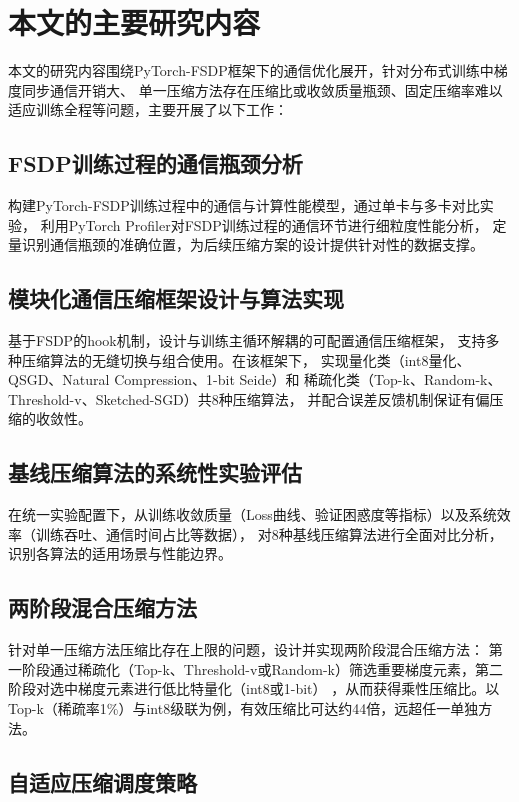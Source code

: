 \section{本文的主要研究内容}

本文的研究内容围绕PyTorch-FSDP框架下的通信优化展开，针对分布式训练中梯度同步通信开销大、
单一压缩方法存在压缩比或收敛质量瓶颈、固定压缩率难以适应训练全程等问题，主要开展了以下工作：

\subsection{FSDP训练过程的通信瓶颈分析}

构建PyTorch-FSDP训练过程中的通信与计算性能模型，通过单卡与多卡对比实验，
利用PyTorch Profiler对FSDP训练过程的通信环节进行细粒度性能分析，
定量识别通信瓶颈的准确位置，为后续压缩方案的设计提供针对性的数据支撑。

\subsection{模块化通信压缩框架设计与算法实现}

基于FSDP的hook机制，设计与训练主循环解耦的可配置通信压缩框架，
支持多种压缩算法的无缝切换与组合使用。在该框架下，
实现量化类（int8量化、QSGD、Natural Compression、1-bit Seide）和
稀疏化类（Top-k、Random-k、Threshold-v、Sketched-SGD）共8种压缩算法，
并配合误差反馈机制保证有偏压缩的收敛性。

\subsection{基线压缩算法的系统性实验评估}

在统一实验配置下，从训练收敛质量（Loss曲线、验证困惑度等指标）以及系统效率（训练吞吐、通信时间占比等数据），
对8种基线压缩算法进行全面对比分析，识别各算法的适用场景与性能边界。

\subsection{两阶段混合压缩方法}

针对单一压缩方法压缩比存在上限的问题，设计并实现两阶段混合压缩方法：
第一阶段通过稀疏化（Top-k、Threshold-v或Random-k）筛选重要梯度元素，第二阶段对选中梯度元素进行低比特量化（int8或1-bit）
，从而获得乘性压缩比。以Top-k（稀疏率1\%）与int8级联为例，有效压缩比可达约44倍，远超任一单独方法。

\subsection{自适应压缩调度策略}

